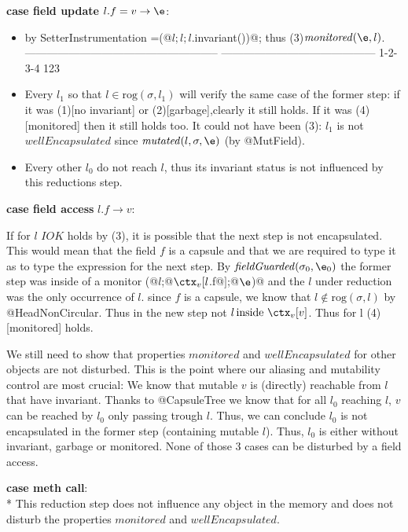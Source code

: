 \noindent\textbf{case field update} $l.f=v\rightarrow \e$:
  \begin{itemize}
  \item by SetterInstrumentation 
  \e=\Q@M(@$l;l;l$\Q@.invariant())@;
  thus (3)$\mathit{monitored}(\e,l)$.
-----------------------------------------------------
------------------------------------------ 1-2-3-4 123
  \item Every $l_1$ so that $l\in \text{rog}(\sigma,l_1)$ will verify the same case
  of the former step:
  if it was (1)[no invariant] or (2)[garbage],clearly it still holds.
  If it was (4)[monitored] then it still holds too.
  It could not have been (3): $l_1$ is not $\mathit{wellEncapsulated}$ since 
$\mathit{mutated}(l,	\sigma,\e)$ (by @MutField).
  \item Every other $l_0$ do not reach $l$, thus its invariant status is not influenced by this reductions step.
\end{itemize}

\noindent\textbf{case field access} $l.f\rightarrow v$:

    If for $l$ $IOK$ holds by (3),  
    it is possible that the next step is not encapsulated.
    This would mean that the field $f$ is a capsule and that we are required
to type it as \Q@mut@ to type the expression for the next step.
By $\mathit{fieldGuarded}(\sigma_0,\e_0)$
    the former step was inside of a monitor \Q@M(@$l$\Q@;@$\ctx_v[l$\Q@.f@$]$\Q@;@$\e$\Q@)@
    and the $l$ under reduction was the only occurrence of $l$.
    since $f$ is a capsule, we know that $l\notin \text{rog}(\sigma,l)$
    by @HeadNonCircular.
    Thus in the new step not $l\, \text{inside}\ \ctx_v[v]$.
    Thus for l (4)[monitored] holds.
    
We still need to show that properties $\mathit{monitored}$ and $\mathit{wellEncapsulated}$
 for other objects are
not disturbed. This is the point where our aliasing and mutability control are most crucial:
We know that mutable $v$ is (directly) reachable from
$l$ that have invariant.
Thanks to @CapsuleTree we know that for all $l_0$ reaching $l$,
$v$ can be reached by $l_0$ only passing trough $l$.
Thus, we can conclude  $l_0$ is not encapsulated in the former step (containing mutable $l$).
Thus, $l_0$ is either without invariant, garbage or monitored.
None of those 3 cases can be disturbed by a field access.


\noindent\textbf{case meth call}:\\*
  This reduction step does not influence any object in the memory and does not
disturb the properties $\mathit{monitored}$ and $\mathit{wellEncapsulated}$.


